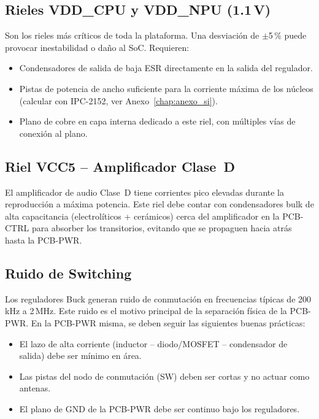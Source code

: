 \subsection{Rieles VDD\_CPU y VDD\_NPU (1.1\,V)}

Son los rieles más críticos de toda la plataforma. Una desviación de $\pm$5\,\%
puede provocar inestabilidad o daño al SoC. Requieren:
\begin{itemize}
  \item Condensadores de salida de baja ESR directamente en la salida del regulador.
  \item Pistas de potencia de ancho suficiente para la corriente máxima de los
    núcleos (calcular con IPC-2152, ver Anexo~\ref{chap:anexo_si}).
  \item Plano de cobre en capa interna dedicado a este riel, con múltiples vías de
    conexión al plano.
\end{itemize}

\subsection{Riel VCC5 -- Amplificador Clase~D}

El amplificador de audio Clase~D tiene corrientes pico elevadas durante la
reproducción a máxima potencia. Este riel debe contar con condensadores bulk
de alta capacitancia (electrolíticos + cerámicos) cerca del amplificador en la
PCB-CTRL para absorber los transitorios, evitando que se propaguen hacia atrás
hasta la PCB-PWR.

\subsection{Ruido de Switching}

Los reguladores Buck generan ruido de conmutación en frecuencias típicas de
200\,kHz a 2\,MHz. Este ruido es el motivo principal de la separación física de la
PCB-PWR. En la PCB-PWR misma, se deben seguir las siguientes buenas prácticas:
\begin{itemize}
  \item El lazo de alta corriente (inductor -- diodo/MOSFET -- condensador de salida)
    debe ser mínimo en área.
  \item Las pistas del nodo de conmutación (SW) deben ser cortas y no actuar
    como antenas.
  \item El plano de GND de la PCB-PWR debe ser continuo bajo los reguladores.
\end{itemize}

